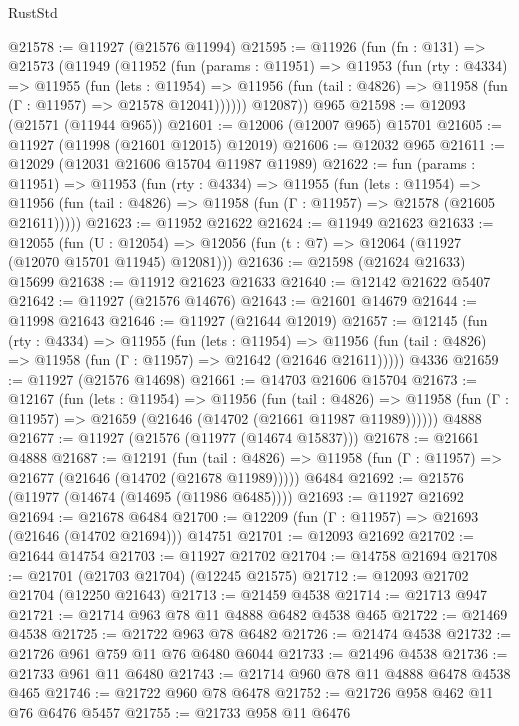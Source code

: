 \begin{lexlean}{RustStd}
\begin{coremodule}
@21578 := @11927 (@21576 @11994)
@21595 := @11926
    (fun (fn : @131) =>
    @21573
      (@11949
        (@11952
          (fun (params : @11951) =>
          @11953
            (fun (rty : @4334) =>
            @11955
              (fun (lets : @11954) =>
              @11956 (fun (tail : @4826) => @11958 (fun (Γ : @11957) => @21578 @12041))))))
        @12087))
    @965
@21598 := @12093 (@21571 (@11944 @965))
@21601 := @12006 (@12007 @965) @15701
@21605 := @11927 (@11998 (@21601 @12015) @12019)
@21606 := @12032 @965
@21611 := @12029 (@12031 @21606 @15704 @11987 @11989)
@21622 := fun (params : @11951) =>
  @11953
    (fun (rty : @4334) =>
    @11955
      (fun (lets : @11954) =>
      @11956 (fun (tail : @4826) => @11958 (fun (Γ : @11957) => @21578 (@21605 @21611)))))
@21623 := @11952 @21622
@21624 := @11949 @21623
@21633 := @12055
    (fun (U : @12054) => @12056 (fun (t : @7) => @12064 (@11927 (@12070 @15701 @11945) @12081)))
@21636 := @21598 (@21624 @21633) @15699
@21638 := @11912 @21623 @21633
@21640 := @12142 @21622 @5407
@21642 := @11927 (@21576 @14676)
@21643 := @21601 @14679
@21644 := @11998 @21643
@21646 := @11927 (@21644 @12019)
@21657 := @12145
    (fun (rty : @4334) =>
    @11955
      (fun (lets : @11954) =>
      @11956 (fun (tail : @4826) => @11958 (fun (Γ : @11957) => @21642 (@21646 @21611)))))
    @4336
@21659 := @11927 (@21576 @14698)
@21661 := @14703 @21606 @15704
@21673 := @12167
    (fun (lets : @11954) =>
    @11956
      (fun (tail : @4826) =>
      @11958 (fun (Γ : @11957) => @21659 (@21646 (@14702 (@21661 @11987 @11989))))))
    @4888
@21677 := @11927 (@21576 (@11977 (@14674 @15837)))
@21678 := @21661 @4888
@21687 := @12191
    (fun (tail : @4826) => @11958 (fun (Γ : @11957) => @21677 (@21646 (@14702 (@21678 @11989)))))
    @6484
@21692 := @21576 (@11977 (@14674 (@14695 (@11986 @6485))))
@21693 := @11927 @21692
@21694 := @21678 @6484
@21700 := @12209 (fun (Γ : @11957) => @21693 (@21646 (@14702 @21694))) @14751
@21701 := @12093 @21692
@21702 := @21644 @14754
@21703 := @11927 @21702
@21704 := @14758 @21694
@21708 := @21701 (@21703 @21704) (@12245 @21575)
@21712 := @12093 @21702 @21704 (@12250 @21643)
@21713 := @21459 @4538
@21714 := @21713 @947
@21721 := @21714 @963 @78 @11 @4888 @6482 @4538 @465
@21722 := @21469 @4538
@21725 := @21722 @963 @78 @6482
@21726 := @21474 @4538
@21732 := @21726 @961 @759 @11 @76 @6480 @6044
@21733 := @21496 @4538
@21736 := @21733 @961 @11 @6480
@21743 := @21714 @960 @78 @11 @4888 @6478 @4538 @465
@21746 := @21722 @960 @78 @6478
@21752 := @21726 @958 @462 @11 @76 @6476 @5457
@21755 := @21733 @958 @11 @6476

\end{coremodule}
\end{lexlean}
